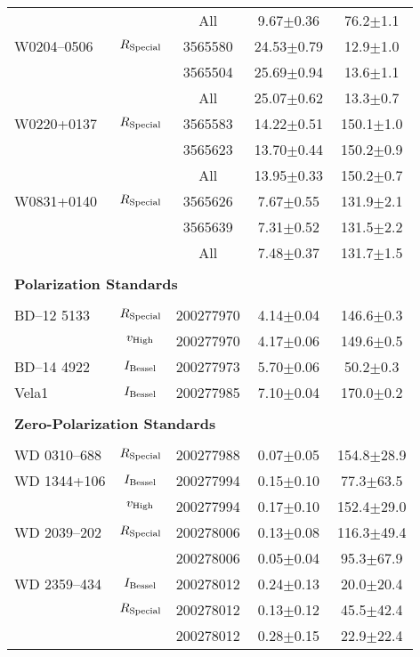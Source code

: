 \begin{table}
\begin{tabular}{lcccc}
                     &                   & All       &  9.67$\pm$0.36 &  76.2$\pm$1.1 \\
        W0204--0506  & $R_{\rm Special}$ & 3565580   & 24.53$\pm$0.79 &  12.9$\pm$1.0 \\
                     &                   & 3565504   & 25.69$\pm$0.94 &  13.6$\pm$1.1 \\
                     &                   & All       & 25.07$\pm$0.62 &  13.3$\pm$0.7 \\
        W0220+0137   & $R_{\rm Special}$ & 3565583   & 14.22$\pm$0.51 & 150.1$\pm$1.0 \\
                     &                   & 3565623   & 13.70$\pm$0.44 & 150.2$\pm$0.9 \\
                     &                   & All       & 13.95$\pm$0.33 & 150.2$\pm$0.7 \\
        W0831+0140   & $R_{\rm Special}$ & 3565626   &  7.67$\pm$0.55 & 131.9$\pm$2.1 \\
                     &                   & 3565639   &  7.31$\pm$0.52 & 131.5$\pm$2.2 \\
                     &                   & All       &  7.48$\pm$0.37 & 131.7$\pm$1.5 \\
        \\
        \multicolumn{5}{l}{\bf{Polarization Standards}}\\\\
        BD--12 5133  & $R_{\rm Special}$ & 200277970 &  4.14$\pm$0.04 & 146.6$\pm$0.3 \\
                     & $v_{\rm High}$    & 200277970 &  4.17$\pm$0.06 & 149.6$\pm$0.5 \\
        BD--14 4922  & $I_{\rm Bessel}$  & 200277973 &  5.70$\pm$0.06 &  50.2$\pm$0.3 \\
        Vela1        & $I_{\rm Bessel}$  & 200277985 &  7.10$\pm$0.04 & 170.0$\pm$0.2 \\
        \\
        \multicolumn{5}{l}{\bf{Zero-Polarization Standards}}\\\\
        WD 0310--688 & $R_{\rm Special}$ & 200277988 &  0.07$\pm$0.05 & 154.8$\pm$28.9 \\
        WD 1344+106  & $I_{\rm Bessel}$  & 200277994 &  0.15$\pm$0.10 &  77.3$\pm$63.5 \\
                     & $v_{\rm High}$    & 200277994 &  0.17$\pm$0.10 & 152.4$\pm$29.0 \\
        WD 2039--202 & $R_{\rm Special}$ & 200278006 &  0.13$\pm$0.08 & 116.3$\pm$49.4 \\
                     &                   & 200278006 &  0.05$\pm$0.04 &  95.3$\pm$67.9 \\
        WD 2359--434 & $I_{\rm Bessel}$  & 200278012 &  0.24$\pm$0.13 &  20.0$\pm$20.4 \\
                     & $R_{\rm Special}$ & 200278012 &  0.13$\pm$0.12 &  45.5$\pm$42.4 \\
                     &                   & 200278012 &  0.28$\pm$0.15 &  22.9$\pm$22.4 \\
        \hline
    \end{tabular}
\end{table}
